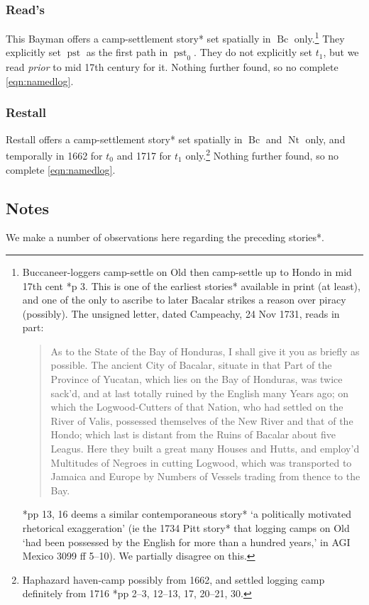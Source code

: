 \documentclass{amsart}
\DeclareMathOperator{\bc}{Bc} %
\DeclareMathOperator{\nt}{Nt} %
\DeclareMathOperator{\pst}{pst} %
\theoremstyle{definition}
\theoremstyle{remark}
\begin{document}
		\subsubsection{Read's}
		\label{sss:reads} This Bayman offers a camp-settlement story* set spatially in \(\bc\) only.\footnote{Buccaneer-loggers camp-settle on Old then camp-settle up to Hondo in mid 17th cent \cite{rds32}*{p 3}. This is one of the earliest stories* available in print (at least), and one of the only to ascribe to later Bacalar strikes a reason over piracy (possibly). The unsigned letter, dated Campeachy, 24 Nov 1731, reads in part:\begin{quote}As to the State of the Bay of Honduras, I shall give it you as briefly as possible. The ancient City of Bacalar, situate in that Part of the Province of Yucatan, which lies on the Bay of Honduras, was twice sack'd, and at last totally ruined by the English many Years ago; on which the Logwood-Cutters of that Nation, who had settled on the River of Valis, possessed themselves of the New River and that of the Hondo; which last is distant from the Ruins of Bacalar about five Leagus. Here they built a great many Houses and Hutts, and employ'd Multitudes of Negroes in cutting Logwood, which was transported to Jamaica and Europe by Numbers of Vessels trading from thence to the Bay.\end{quote} \cite{res19}*{pp 13, 16} deems a similar contemporaneous story* `a politically motivated rhetorical exaggeration' (ie the 1734 Pitt story* that logging camps on Old `had been possessed by the English for more than a hundred years,' in AGI Mexico 3099 ff 5--10). We partially disagree on this.} %
		They explicitly set \(\pst\) as the first path in \(\pst_0\). They do not explicitly set \(t_1\), but we read \emph{prior} to mid 17th century for it. Nothing further found, so no complete \ref{eqn:namedlog}.
		\subsubsection{Restall}
		\label{sss:restall}
		Restall offers a camp-settlement story* set spatially in \(\bc\) and \(\nt\) only, and temporally in 1662 for \(t_0\) and 1717 for \(t_1\) only.\footnote{Haphazard haven-camp possibly from 1662, and settled logging camp definitely from 1716 \cite{res19}*{pp 2--3, 12--13, 17, 20--21, 30}.} Nothing further found, so no complete \ref{eqn:namedlog}.
	\subsection{Notes}
	\label{ss:noteson}
		We make a number of observations here regarding the preceding stories*.
\end{document}
